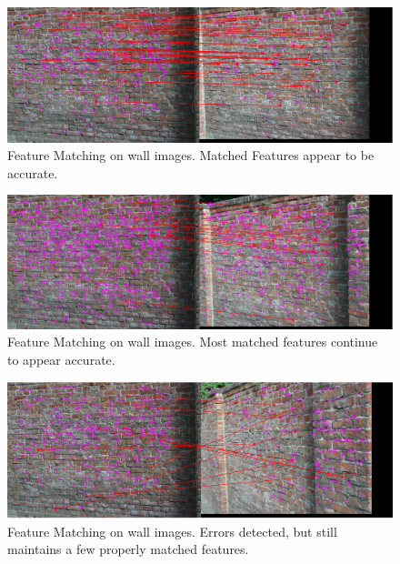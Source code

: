 \documentclass[12pt,journal,compsoc]{IEEEtran}
\begin{document}
\begin{figure}[h]
	\centering
		  \centering
		  \includegraphics[width=1\linewidth]{img/wall1}
		  \caption{Feature Matching on wall images. Matched Features appear to be accurate.}
		  \label{fig:wall1}
\end{figure}

\begin{figure}[h]
	\centering
		  \centering
		  \includegraphics[width=1\linewidth]{img/wall2}
		  \caption{Feature Matching on wall images. Most matched features continue to appear accurate.}
		  \label{fig:wall2}
\end{figure}

\begin{figure}[h]
	\centering
		  \centering
		  \includegraphics[width=1\linewidth]{img/wall3}
		  \caption{Feature Matching on wall images. Errors detected, but still maintains a few properly matched features.}
		  \label{fig:wall3}
\end{figure}
\end{document}
